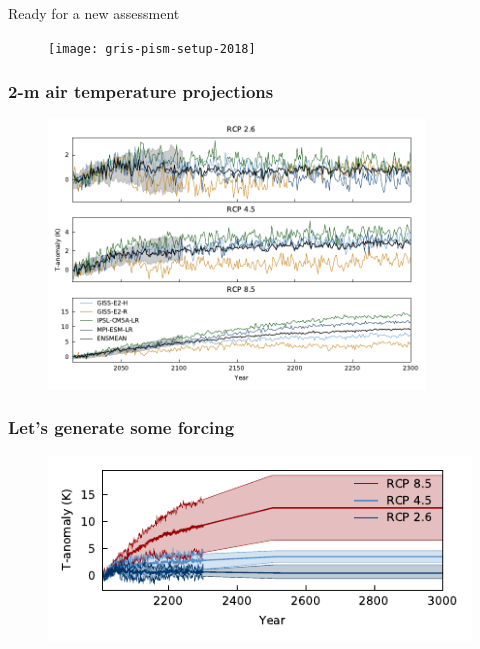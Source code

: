 \documentclass[hide notes,intlimits]{beamer}
\begin{document}
\begin{frame}{Ready for a new assessment}
  \begin{figure}
    \texttt{[image: gris-pism-setup-2018]}
  \end{figure}
\end{frame}


\begin{frame}
  \frametitle{2-m air temperature projections}
  \begin{figure}
    \includegraphics[width=10cm]{gcm_2300_cmip5_delta_T}
  \end{figure}
\end{frame}


\begin{frame}
  \frametitle{Let's generate some forcing}
  \begin{figure}
    \includegraphics[width=12cm]{gcm_cmip5_forcing_delta_T}
  \end{figure}
\end{frame}
\end{document}
